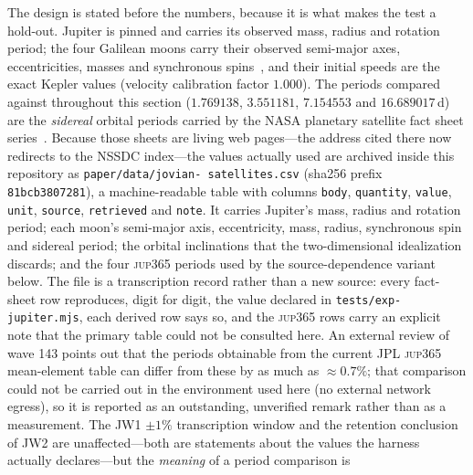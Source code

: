 \documentclass[aps,reprint,amsmath,amssymb,nofootinbib,superscriptaddress,floatfix]{revtex4-2}
\begin{document}
The design is stated before the numbers, because it is what makes the
test a hold-out.
Jupiter is pinned and carries its observed mass, radius and rotation
period; the four Galilean moons carry their observed semi-major axes,
eccentricities, masses and synchronous spins~\cite{NASASats}, and their
initial speeds are the exact Kepler values (velocity calibration factor
$1.000$).
The periods compared against throughout this section
($1.769138$, $3.551181$, $7.154553$ and $16.689017$\,d) are the
\emph{sidereal} orbital periods carried by the NASA planetary
satellite fact sheet series~\cite{NASASats}.
Because those sheets are living web pages---the address cited there now
redirects to the NSSDC index---the values actually used are archived
inside this repository as
\texttt{paper/\allowbreak data/\allowbreak jovian-\allowbreak
satellites.csv} (sha256 prefix \texttt{81bcb3807281}), a
machine-readable table with columns
\texttt{body}, \texttt{quantity}, \texttt{value}, \texttt{unit},
\texttt{source}, \texttt{retrieved} and \texttt{note}.
It carries Jupiter's mass, radius and rotation period; each moon's
semi-major axis, eccentricity, mass, radius, synchronous spin and
sidereal period; the orbital inclinations that the two-dimensional
idealization discards; and the four \textsc{jup365} periods used by the
source-dependence variant below.
The file is a transcription record rather than a new source: every
fact-sheet row reproduces, digit for digit, the value declared in
\texttt{tests/exp-jupiter.mjs}, each derived row says so, and the
\textsc{jup365} rows carry an explicit note that the primary table
could not be consulted here.
An external review of wave 143 points out that the periods obtainable
from the current JPL \textsc{jup365} mean-element table can differ
from these by as much as ${\approx}0.7\%$; that comparison could not
be carried out in the environment used here (no external network
egress), so it is reported as an outstanding, unverified remark rather
than as a measurement.
The JW1 $\pm1\%$ transcription window and the retention conclusion of
JW2 are unaffected---both are statements about the values the harness
actually declares---but the \emph{meaning} of a period comparison is
\end{document}
